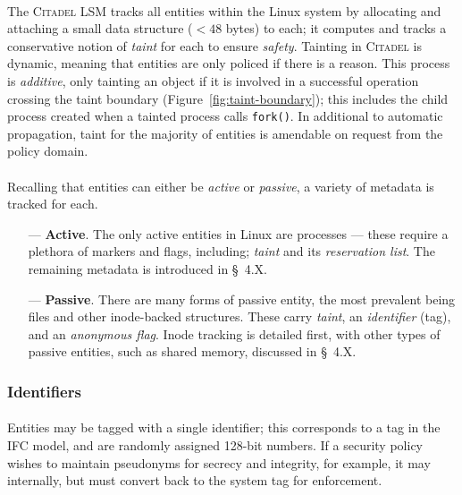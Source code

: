 \paragraph{} The \textsc{Citadel} LSM tracks all entities within the Linux system by allocating and attaching a small data structure ($<48$ bytes) to each; it computes and tracks a conservative notion of \textit{taint} for each to ensure \textit{safety}. Tainting in \textsc{Citadel} is dynamic, meaning that entities are only policed if there is a reason. This process is \textit{additive}, only tainting an object if it is involved in a successful operation crossing the taint boundary (Figure~\ref{fig:taint-boundary}); this includes the child process created when a tainted process calls \texttt{fork()}. In additional to automatic propagation, taint for the majority of entities is amendable on request from the policy domain.

\paragraph{} Recalling that entities can either be \textit{active} or \textit{passive}, a variety of metadata is tracked for each.

\begin{enumerate}
    \item[---]\textbf{Active}. The only active entities in Linux are processes --- these require a plethora of markers and flags, including; \textit{taint} and its \textit{reservation list}. The remaining metadata is introduced in §~4.X.
    \item[---] \textbf{Passive}. There are many forms of passive entity, the most prevalent being files and other inode-backed structures. These carry \textit{taint}, an \textit{identifier} (tag), and an \textit{anonymous flag}. Inode tracking is detailed first, with other types of passive entities, such as shared memory, discussed in §~4.X. 
\end{enumerate}

\subsubsection{Identifiers}
\paragraph{} Entities may be tagged with a single identifier; this corresponds to a tag in the IFC model, and are randomly assigned 128-bit numbers. If a security policy wishes to maintain pseudonyms for secrecy and integrity, for example, it may internally, but must convert back to the system tag for enforcement.

